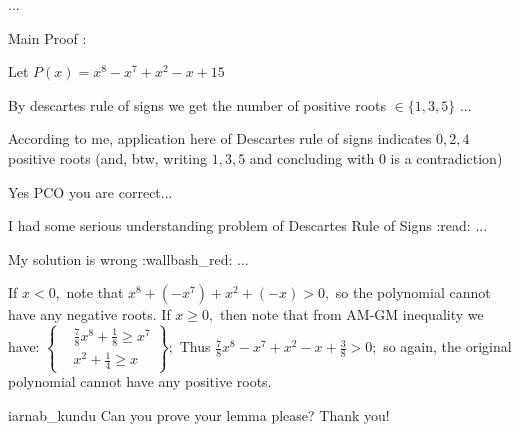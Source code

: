 \begin{solution}
	\begin{tcolorbox}...
\begin{bolded} Main Proof :\end{bolded} Let $P(x)=x^8-x^7+x^2-x+15$

By descartes rule of signs we get the number of positive roots $\in\{1,3,5\}$
...\end{tcolorbox}
According to me, application here of Descartes rule of signs indicates $0,2,4$ positive roots
(and, btw, writing $1,3,5$ and concluding with $0$ is a contradiction)
\end{solution}



\begin{solution}
	Yes PCO you are correct...

I had some serious understanding problem of Descartes Rule of Signs :read: ...

My solution is wrong :wallbash_red:   ...
\end{solution}



\begin{solution}
	If $x<0,$ note that $x^8+(-x^7)+x^2+(-x)>0,$ so the polynomial cannot have any negative roots.
If $x\geq 0,$ then note that from AM-GM inequality we have:
$\left\{\begin{aligned}& \frac 78 x^8+\frac 18\geq x^7\\& x^2+\frac 14\geq x\end{aligned}\right\} ;$
Thus $\frac 78x^8-x^7+x^2-x+\frac 38>0;$ so again, the original polynomial cannot have any positive roots.
\end{solution}



\begin{solution}
	iarnab_kundu 
Can you prove your lemma please?
Thank you!
\end{solution}



